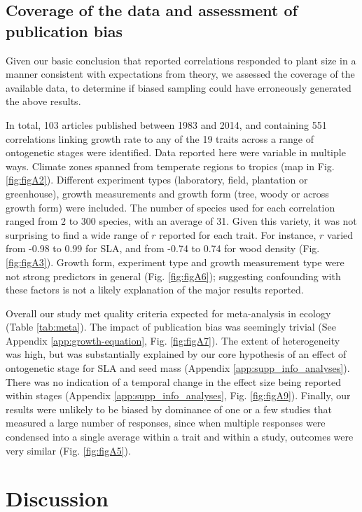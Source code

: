 \documentclass[a4paper,11pt]{article}
\begin{document}
\subsection*{Coverage of the data and assessment of publication bias}

Given our basic conclusion that reported correlations responded to plant size in a manner consistent with expectations from theory, we assessed the coverage of the available data, to determine if biased sampling could have erroneously generated the above results.

In total, 103 articles published between 1983 and 2014, and containing 551 correlations linking growth rate to any of the 19 traits across a range of ontogenetic stages were identified. Data reported here were variable in multiple ways. Climate zones spanned from temperate regions to tropics (map in Fig. \ref{fig:figA2}). Different experiment types (laboratory, field, plantation or greenhouse), growth measurements and growth form (tree, woody or across growth form) were included. The number of species used for each correlation ranged from 2 to 300 species, with an average of 31. Given this variety, it was not surprising to find a wide range of $r$ reported for each trait. For instance, $r$ varied from -0.98 to 0.99 for SLA, and from -0.74 to 0.74 for wood density (Fig. \ref{fig:figA3}). Growth form, experiment type and growth measurement type were not strong predictors in general (Fig. \ref{fig:figA6}); suggesting confounding with these factors is not a likely explanation of the major results reported.

Overall our study met quality criteria expected for meta-analysis in ecology (Table \ref{tab:meta}). The impact of publication bias was seemingly trivial (See Appendix \ref{app:growth-equation}, Fig. \ref{fig:figA7}). The extent of heterogeneity was high, but was substantially explained by our core hypothesis of an effect of ontogenetic stage for SLA and seed mass (Appendix \ref{app:supp_info_analyses}). There was no indication of a temporal change in the effect size being reported within stages (Appendix \ref{app:supp_info_analyses}, Fig. \ref{fig:figA9}). Finally, our results were unlikely to be biased by dominance of one or a few studies that measured a large number of responses, since when multiple responses were condensed into a single average within a trait and within a study, outcomes were very similar (Fig. \ref{fig:figA5}).


\section*{Discussion}\label{discussion}
\end{document}
